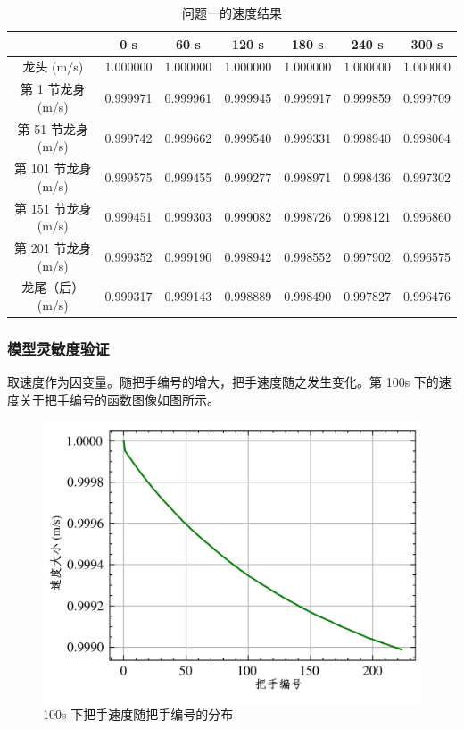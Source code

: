 \documentclass[a4paper]{article}
\begin{document}
		\begin{table}[H] %
		\captionsetup{skip=4pt} %
		\caption{问题一的速度结果}
		\centering
		\setlength{\arrayrulewidth}{0.5pt} %
		\begin{tabular}{|c|c|c|c|c|c|c|} %
			\hline
			& 0 s & 60 s & 120 s & 180 s & 240 s & 300 s \\ \hline
			龙头 (m/s)      &    1.000000 &	1.000000 &	1.000000 &	1.000000 &	1.000000 &	1.000000 \\ \hline
			第 1 节龙身 (m/s) &  0.999971 &	0.999961 &	0.999945 &	0.999917 &	0.999859 &	0.999709 \\ \hline
			第 51 节龙身 (m/s) & 0.999742 &	0.999662 &	0.999540 &	0.999331 &	0.998940 &	0.998064 \\ \hline
			第 101 节龙身 (m/s) &0.999575 &	0.999455 &	0.999277 &	0.998971 &	0.998436 &	0.997302 \\ \hline
			第 151 节龙身 (m/s) &0.999451 &	0.999303 &	0.999082 &	0.998726 &	0.998121 &	0.996860 \\ \hline
			第 201 节龙身 (m/s) &0.999352 &	0.999190 &	0.998942 &	0.998552 &	0.997902 &	0.996575 \\ \hline
			龙尾（后） (m/s) &   0.999317 &	0.999143 &	0.998889 &	0.998490 &	0.997827 &	0.996476 \\ \hline
		\end{tabular}
		\end{table}
		
		\subsubsection{模型灵敏度验证}
		
		取速度作为因变量。随把手编号的增大，把手速度随之发生变化。第 100s 下的速度关于把手编号的函数图像如图所示。
		
		\begin{figure}[H]
			\centering
			\includegraphics[width=0.5\linewidth]{image/Figure_5131.png}
			\caption{100s 下把手速度随把手编号的分布}
			\label{Figure_5131}
		\end{figure}
		
\end{document}
